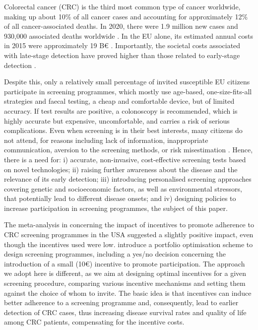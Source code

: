 \documentclass[12pt]{article}
\begin{document}
Colorectal cancer (CRC) is the third most common type of cancer worldwide, making up about 10\% of all cancer cases \citep{WHO} and accounting for approximately 12\% of all cancer-associated deaths. In 2020, there were 1.9 million new cases and 930,000 associated deaths worldwide \citep{morgan2023global}. In the EU alone, its estimated annual costs in 2015 were approximately 19 B€ \citep{henderson2021economic}. Importantly, the societal costs associated with late-stage detection have proved higher than those related to early-stage detection \citep{mar2017cost}.

Despite this, only a relatively small percentage of invited susceptible EU citizens participate in screening programmes, which mostly use age-based, one-size-fits-all strategies and faecal testing, a cheap and comfortable device, but of limited accuracy. If test results are positive, a colonoscopy is recommended, which is highly accurate but expensive, uncomfortable, and carries a risk of serious complications. Even when screening is in their best interests, many citizens do not attend, for reasons including lack of information, inappropriate communication, aversion to the screening methods, or risk misestimation \citep{KASTRINOS}. Hence, there is a need for: i) accurate, non-invasive, cost-effective screening tests based on novel technologies; ii) raising further awareness about the disease and the relevance of its early detection; iii) introducing personalised screening approaches covering genetic and socioeconomic factors, as well as environmental stressors, that potentially lead to different disease onsets; and iv) designing policies to increase participation in screening programmes, the subject of this paper.

The meta-analysis in \cite{facciorusso2021addition} concerning the impact of incentives to promote adherence to CRC screening programmes in the USA suggested a slightly positive impact, even though the incentives used were low. \cite{neuvonen2025optimizing} introduce a portfolio optimisation scheme to design screening programmes, including a yes/no decision concerning the introduction of a small (10€) incentive to promote participation. The approach we adopt here is different, as we aim at designing optimal incentives for a given screening procedure, comparing various incentive mechanisms and setting them against the choice of whom to invite. The basic idea is that incentives can induce better adherence to a screening programme and, consequently, lead to earlier detection of CRC cases, thus increasing disease survival rates and quality of life among CRC patients, compensating for the incentive costs.
\end{document}
